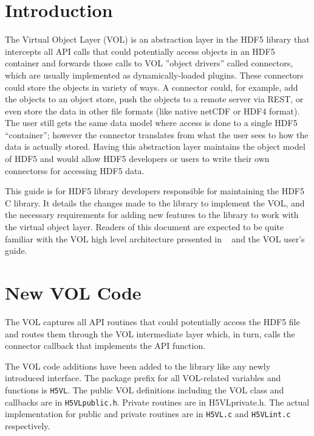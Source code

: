 

\section{Introduction}
The Virtual Object Layer (VOL) is an abstraction layer in the HDF5
library that intercepts all API calls that could potentially access
objects in an HDF5 container and forwards those calls to VOL
''object drivers'' called connectors, which are usually implemented as
dynamically-loaded plugins. These connectors could store the objects in variety of
ways. A connector could, for example, add the objects
to an object store, push the objects to a remote server via REST, or even store the data in other file formats (like
native netCDF or HDF4 format). The user still gets the same data model
where access is done to a single HDF5 “container”; however the connector
translates from what the user sees to how the data is
actually stored. Having this abstraction layer maintains the object
model of HDF5 and would allow HDF5 developers or users to write their
own connectorss for accessing HDF5 data.

This guide is for HDF5 library developers responsible for maintaining the HDF5 C library. It details the changes made to the library to implement the VOL, and the necessary requirements for adding new features to the library to work with the virtual object layer. Readers of this document are expected to be quite familiar with the VOL high level architecture presented in ~\cite{vol:rfc} and the VOL user's guide\cite{vol:ug}.

\section{New VOL Code}
The VOL captures all API routines that could potentially access the HDF5 file and routes them through the VOL intermediate layer which, in turn, calls the connector callback that implements the API function.

The VOL code additions have been added to the library like any newly introduced interface. The package prefix for all VOL-related variables and functions is {\tt H5VL}. The public VOL definitions including the VOL class and callbacks are in {\tt H5VLpublic.h}. Private routines are in {H5VLprivate.h}. The actual implementation for public and private routines are in {\tt H5VL.c} and {\tt H5VLint.c} respectively.

